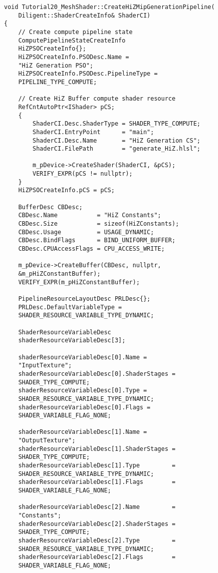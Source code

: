 \begin{lstlisting}
void Tutorial20_MeshShader::CreateHiZMipGenerationPipeline(
    Diligent::ShaderCreateInfo& ShaderCI)
{
    // Create compute pipeline state
    ComputePipelineStateCreateInfo 
    HiZPSOCreateInfo{};
    HiZPSOCreateInfo.PSODesc.Name = 
    "HiZ Generation PSO";
    HiZPSOCreateInfo.PSODesc.PipelineType = 
    PIPELINE_TYPE_COMPUTE;

    // Create HiZ Buffer compute shader resource
    RefCntAutoPtr<IShader> pCS;
    {
        ShaderCI.Desc.ShaderType = SHADER_TYPE_COMPUTE;
        ShaderCI.EntryPoint      = "main";
        ShaderCI.Desc.Name       = "HiZ Generation CS";
        ShaderCI.FilePath        = "generate_HiZ.hlsl";

        m_pDevice->CreateShader(ShaderCI, &pCS);
        VERIFY_EXPR(pCS != nullptr);
    }
    HiZPSOCreateInfo.pCS = pCS;

    BufferDesc CBDesc;
    CBDesc.Name           = "HiZ Constants";
    CBDesc.Size           = sizeof(HiZConstants);
    CBDesc.Usage          = USAGE_DYNAMIC;
    CBDesc.BindFlags      = BIND_UNIFORM_BUFFER;
    CBDesc.CPUAccessFlags = CPU_ACCESS_WRITE;

    m_pDevice->CreateBuffer(CBDesc, nullptr, 
    &m_pHiZConstantBuffer);
    VERIFY_EXPR(m_pHiZConstantBuffer);

    PipelineResourceLayoutDesc PRLDesc{};
    PRLDesc.DefaultVariableType = 
    SHADER_RESOURCE_VARIABLE_TYPE_DYNAMIC;

    ShaderResourceVariableDesc 
    shaderResourceVariableDesc[3];

    shaderResourceVariableDesc[0].Name = 
    "InputTexture";
    shaderResourceVariableDesc[0].ShaderStages = 
    SHADER_TYPE_COMPUTE;
    shaderResourceVariableDesc[0].Type = 
    SHADER_RESOURCE_VARIABLE_TYPE_DYNAMIC;
    shaderResourceVariableDesc[0].Flags = 
    SHADER_VARIABLE_FLAG_NONE;

    shaderResourceVariableDesc[1].Name = 
    "OutputTexture";
    shaderResourceVariableDesc[1].ShaderStages =
    SHADER_TYPE_COMPUTE;
    shaderResourceVariableDesc[1].Type         = 
    SHADER_RESOURCE_VARIABLE_TYPE_DYNAMIC;
    shaderResourceVariableDesc[1].Flags        = 
    SHADER_VARIABLE_FLAG_NONE;

    shaderResourceVariableDesc[2].Name         = 
    "Constants";
    shaderResourceVariableDesc[2].ShaderStages = 
    SHADER_TYPE_COMPUTE;
    shaderResourceVariableDesc[2].Type         = 
    SHADER_RESOURCE_VARIABLE_TYPE_DYNAMIC;
    shaderResourceVariableDesc[2].Flags        = 
    SHADER_VARIABLE_FLAG_NONE;


\end{lstlisting}
